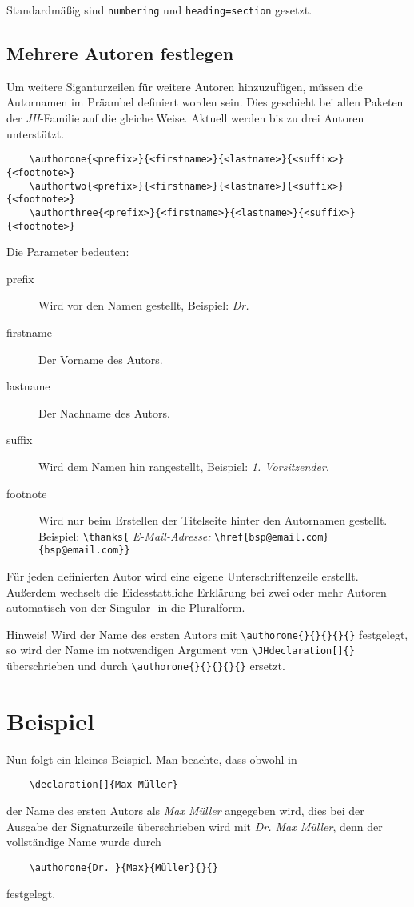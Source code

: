 \documentclass[%
	fontsize=10pt, 
	DIV=8, 
]{scrartcl}
\begin{document}
Standardmäßig sind \verb+numbering+ und \verb+heading=section+ gesetzt.

\subsection*{Mehrere Autoren festlegen}
Um weitere Siganturzeilen für weitere Autoren hinzuzufügen, müssen die Autornamen im Präambel definiert worden sein. Dies geschieht bei allen Paketen der \mbox{\textit{JH}-Familie} auf die gleiche Weise. Aktuell werden bis zu drei Autoren unterstützt.

\begingroup\small
\begin{verbatim}
	\authorone{<prefix>}{<firstname>}{<lastname>}{<suffix>}{<footnote>}
	\authortwo{<prefix>}{<firstname>}{<lastname>}{<suffix>}{<footnote>}
	\authorthree{<prefix>}{<firstname>}{<lastname>}{<suffix>}{<footnote>}
\end{verbatim}
\endgroup

Die Parameter bedeuten:
\begin{description}
	\item[prefix] Wird vor den Namen gestellt, Beispiel: \textit{Dr.}
	\item[firstname] Der Vorname des Autors.
	\item[lastname] Der Nachname des Autors.
	\item[suffix] Wird dem Namen hin rangestellt, Beispiel: \textit{1. Vorsitzender}.
	\item[footnote] Wird nur beim Erstellen der Titelseite hinter den Autornamen gestellt. Beispiel: \verb+\thanks{+ \textit{E-Mail-Adresse:} \verb+\href{bsp@email.com}{bsp@email.com}}+
\end{description}

Für jeden definierten Autor wird eine eigene Unterschriftenzeile erstellt. Außerdem wechselt die Eidesstattliche Erklärung bei zwei oder mehr Autoren automatisch von der Singular- in die Pluralform.

Hinweis! Wird der Name des ersten Autors mit \verb+\authorone{}{}{}{}{}+ festgelegt, so wird der Name im notwendigen Argument von \verb+\JHdeclaration[]{}+ überschrieben und durch \verb+\authorone{}{}{}{}{}+ ersetzt.

\section{Beispiel}
Nun folgt ein kleines Beispiel. Man beachte, dass obwohl in
\begin{verbatim}
	\declaration[]{Max Müller}
\end{verbatim} der Name des ersten Autors als \textit{Max Müller} angegeben wird, dies bei der Ausgabe der Signaturzeile überschrieben wird mit \textit{Dr. Max Müller}, denn der vollständige Name wurde durch
\begin{verbatim}
	\authorone{Dr. }{Max}{Müller}{}{}
\end{verbatim}
festgelegt.
\end{document}
